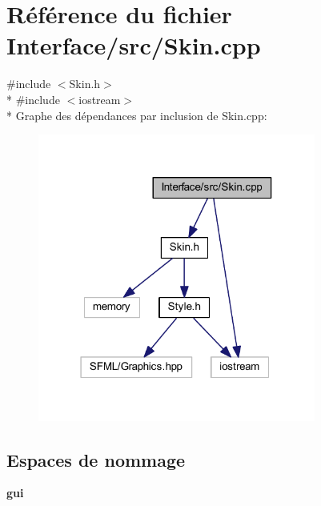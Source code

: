 \section{Référence du fichier Interface/src/\+Skin.cpp}
\label{_skin_8cpp}
{\ttfamily \#include $<$Skin.\+h$>$}\\*
{\ttfamily \#include $<$iostream$>$}\\*
Graphe des dépendances par inclusion de Skin.\+cpp\+:\nopagebreak
\begin{figure}[H]
\begin{center}
\leavevmode
\includegraphics[width=259pt]{_skin_8cpp__incl}
\end{center}
\end{figure}
\subsection*{Espaces de nommage}
\begin{DoxyCompactItemize}
\item 
 {\bf gui}
\end{DoxyCompactItemize}
